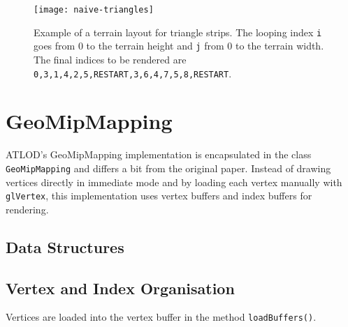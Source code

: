 \begin{figure}[H]
  \centering
  \texttt{[image: naive-triangles]}
  \caption{Example of a terrain layout for triangle strips. The looping index \texttt{i} goes from 0 to the terrain height and \texttt{j} from 0 to the terrain width. The final indices to be rendered are \texttt{0,3,1,4,2,5,RESTART,3,6,4,7,5,8,RESTART}.}\label{fig:naive-triangles}
\end{figure}

\section{GeoMipMapping}
ATLOD's GeoMipMapping implementation is encapsulated in the class \texttt{GeoMipMapping} and differs a bit from the 
original paper. Instead of drawing vertices directly in immediate mode and by loading each vertex manually with \texttt{glVertex},
this implementation uses vertex buffers and index buffers for rendering. 

\subsection{Data Structures}

\subsection{Vertex and Index Organisation}
Vertices are loaded into the vertex buffer in the method \texttt{loadBuffers()}. 

